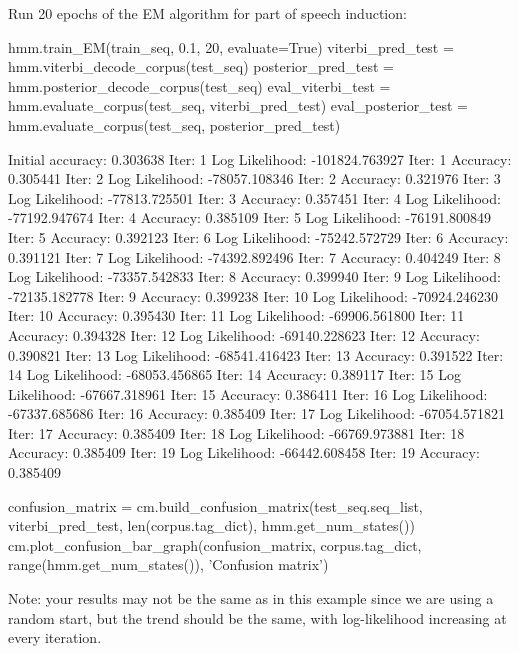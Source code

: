 \begin{exercise}
Run 20 epochs of the EM algorithm for part of speech induction:
\begin{python}
hmm.train_EM(train_seq, 0.1, 20, evaluate=True)
viterbi_pred_test = hmm.viterbi_decode_corpus(test_seq)
posterior_pred_test = hmm.posterior_decode_corpus(test_seq)
eval_viterbi_test =   hmm.evaluate_corpus(test_seq, viterbi_pred_test)
eval_posterior_test = hmm.evaluate_corpus(test_seq, posterior_pred_test)

Initial accuracy: 0.303638
Iter: 1 Log Likelihood: -101824.763927
Iter: 1 Accuracy: 0.305441
Iter: 2 Log Likelihood: -78057.108346
Iter: 2 Accuracy: 0.321976
Iter: 3 Log Likelihood: -77813.725501
Iter: 3 Accuracy: 0.357451
Iter: 4 Log Likelihood: -77192.947674
Iter: 4 Accuracy: 0.385109
Iter: 5 Log Likelihood: -76191.800849
Iter: 5 Accuracy: 0.392123
Iter: 6 Log Likelihood: -75242.572729
Iter: 6 Accuracy: 0.391121
Iter: 7 Log Likelihood: -74392.892496
Iter: 7 Accuracy: 0.404249
Iter: 8 Log Likelihood: -73357.542833
Iter: 8 Accuracy: 0.399940
Iter: 9 Log Likelihood: -72135.182778
Iter: 9 Accuracy: 0.399238
Iter: 10 Log Likelihood: -70924.246230
Iter: 10 Accuracy: 0.395430
Iter: 11 Log Likelihood: -69906.561800
Iter: 11 Accuracy: 0.394328
Iter: 12 Log Likelihood: -69140.228623
Iter: 12 Accuracy: 0.390821
Iter: 13 Log Likelihood: -68541.416423
Iter: 13 Accuracy: 0.391522
Iter: 14 Log Likelihood: -68053.456865
Iter: 14 Accuracy: 0.389117
Iter: 15 Log Likelihood: -67667.318961
Iter: 15 Accuracy: 0.386411
Iter: 16 Log Likelihood: -67337.685686
Iter: 16 Accuracy: 0.385409
Iter: 17 Log Likelihood: -67054.571821
Iter: 17 Accuracy: 0.385409
Iter: 18 Log Likelihood: -66769.973881
Iter: 18 Accuracy: 0.385409
Iter: 19 Log Likelihood: -66442.608458
Iter: 19 Accuracy: 0.385409

confusion_matrix = cm.build_confusion_matrix(test_seq.seq_list, viterbi_pred_test, 
                                             len(corpus.tag_dict), hmm.get_num_states())
cm.plot_confusion_bar_graph(confusion_matrix, corpus.tag_dict, 
                            range(hmm.get_num_states()), 'Confusion matrix')
\end{python}
Note: your results may not be the same as in this example since we are using a random start, but the trend should be the same, 
with log-likelihood increasing at every iteration. 
\end{exercise}

